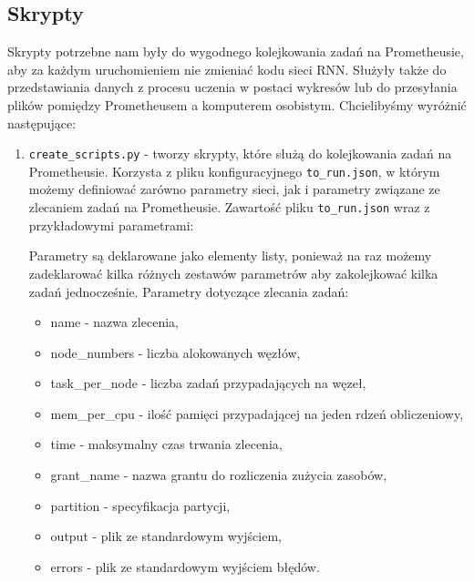 \subsection{Skrypty}
Skrypty potrzebne nam były do wygodnego kolejkowania zadań na Prometheusie, aby za 
każdym uruchomieniem nie zmieniać kodu sieci RNN. Służyły także do przedstawiania danych z procesu uczenia w postaci wykresów
lub do przesyłania plików pomiędzy Prometheusem a komputerem osobistym. Chcielibyśmy wyróżnić następujące:
\begin{enumerate}
	\item {\texttt{create\_scripts.py} } - 
	tworzy skrypty, które służą do kolejkowania zadań na Prometheusie. Korzysta z pliku konfiguracyjnego \texttt{to\_run.json},
	w którym możemy definiować zarówno parametry sieci, jak i parametry związane ze zlecaniem zadań na Prometheusie.
	Zawartość pliku \texttt{to\_run.json} wraz z przykładowymi parametrami:
	
	\begin{import}
		[
		  {
		    "beginning": "#!/bin/sh",
		    "name": "#SBATCH -J test",
		    "node_numbers": "#SBATCH -N 1",
		    "tasks_per_node": "#SBATCH --ntasks-per-node=1",
		    "mem_per_cpu": "#SBATCH --mem-per-cpu=5GB",
		    "time": "#SBATCH --time=00:20:00",
		    "grant_name": "#SBATCH -A ap2018",
		    "partition": "#SBATCH -p plgrid",
		    "output": "#SBATCH --output=",
		    "errors": "#SBATCH --error=",
		    "hidden_size": "100",
		    "num_layers": "2",
		    "num_epochs": "5",
		    "batch_size": "40",
		    "timesteps": "50",
		    "learning_rate": "0.004",
		    "authors_size": "100",
		    "vocab_size": "48",
		    "save_path": "../results/",
		    "learning_tensors_path": "../data/dutch/tensors/known/",
		    "testing_tensors_path": "../data/dutch/tensors/known/",
		    "language": "DU"
		  }
		]
	\end{import}
	Parametry są deklarowane jako elementy listy, ponieważ na raz możemy zadeklarować kilka różnych zestawów
	parametrów aby zakolejkować kilka zadań jednocześnie.
	Parametry dotyczące zlecania zadań:
	\begin{itemize}
	  \item name - nazwa zlecenia,
	  \item node\_numbers - liczba alokowanych węzłów,
	  \item task\_per\_node - liczba zadań przypadających na węzeł,
	  \item mem\_per\_cpu - ilość pamięci przypadającej na jeden rdzeń obliczeniowy,
	  \item time - maksymalny czas trwania zlecenia,
	  \item grant\_name - nazwa grantu do rozliczenia zużycia zasobów,
	  \item partition - specyfikacja partycji,
	  \item output - plik ze standardowym wyjściem,
	  \item errors - plik ze standardowym wyjściem błędów.
	\end{itemize}
	

\end{enumerate}
